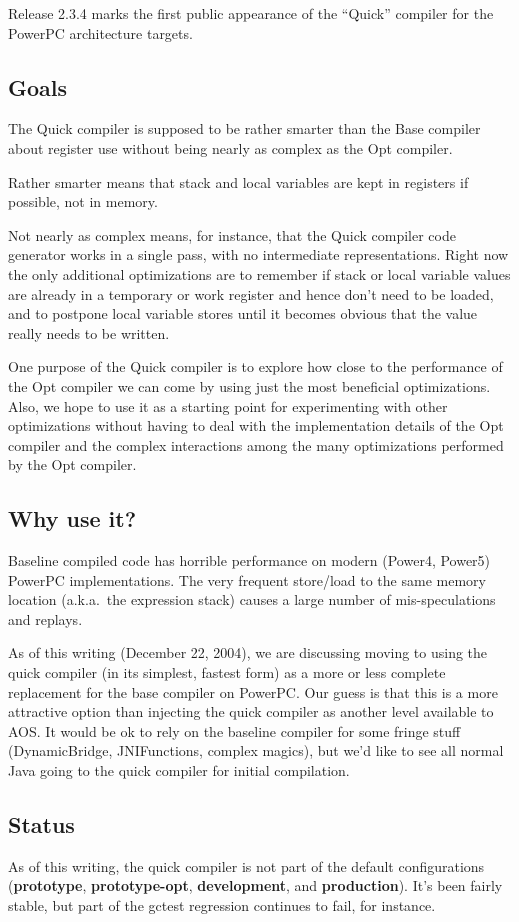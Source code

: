 Release 2.3.4 marks the first public appearance of the ``Quick''
compiler for the PowerPC architecture targets.  

\subsection{Goals}

The Quick compiler is supposed to be rather smarter than the Base
compiler about register use without being nearly as complex as the Opt
compiler. 

Rather smarter means that stack and local variables are kept in
registers if possible, not in memory. 

Not nearly as complex means, for instance, that the Quick compiler
code generator works in a single pass, with no intermediate
representations. Right now the only additional optimizations are to
remember if stack or local variable values are already in a temporary
or work register and hence don't need to be loaded, and to postpone
local variable stores until it becomes obvious that the value really
needs to be written. 

One purpose of the Quick compiler is to explore how close to the
performance of the Opt compiler we can come by using just the most
beneficial optimizations. Also, we hope to use it as a starting point
for experimenting with other optimizations without having to deal with
the implementation details of the Opt compiler and the complex
interactions among the many optimizations performed by the Opt
compiler. 

\subsection{Why use it?}

Baseline compiled code has horrible performance on modern (Power4,
Power5) PowerPC implementations.  The very frequent store/load to the
same memory location (a.k.a.\ the expression stack) causes a large number
of mis-speculations and replays. 

As of this writing (December 22, 2004), we are discussing moving to
using the quick compiler (in its simplest, fastest form) as a more or
less complete replacement for the base compiler on PowerPC.  Our guess
is that this is a more attractive option than injecting the quick
compiler as another level available to AOS.  It would be ok to rely on
the baseline compiler for some fringe stuff (DynamicBridge,
JNIFunctions, complex magics), but we'd like to see all normal Java
going to the quick compiler for initial compilation.

\subsection{Status}

As of this writing, the quick compiler is not part of the default
configurations (\textbf{prototype}, \textbf{prototype-opt},
\textbf{development}, and \textbf{production}).  It's been fairly
stable, but part of the gctest regression continues to fail, for
instance. 

